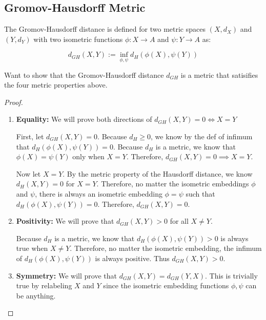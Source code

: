 \documentclass{article}
\begin{document}
    \subsection{Gromov-Hausdorff Metric}

    The Gromov-Hausdorff distance is defined for two metric spaces $(X, d_X)$ and $(Y, d_Y)$ with two isometric functions $\phi: X \rightarrow A$ and $\psi: Y \rightarrow A$ as: 

    \begin{equation*}
        d_{GH}(X,Y) := \inf_{\phi, \psi} d_H(\phi(X), \psi(Y))
    \end{equation*}

    Want to show that the Gromov-Hausdorff distance $d_{GH}$ is a metric that satisifies the four metric properties above.

    \begin{proof}
    \begin{enumerate}
    We will prove all four proerties of a metric in a metric space for the Gromov-Hausdorff distance.

        \item \textbf{Equality:} We will prove both directions of $d_{GH}(X,Y) = 0 \iff X = Y $
        
        First, let $d_{GH}(X,Y) = 0$. Because $d_H \geq 0$, we know by the def of infimum that $d_H(\phi(X), \psi(Y)) = 0$. Because $d_H$ is a metric, we know that $\phi(X) = \psi(Y)$ only when $X=Y$. Therefore, $d_{GH}(X,Y) = 0 \implies X = Y$.

        Now let $X=Y$. By the metric property of the Hausdorff distance, we know $d_H(X,Y) = 0$ for $X=Y$. Therefore, no matter the isometric embeddings $\phi$ and $\psi$, there is always an isometric embedding $\phi = \psi$ such that $d_H(\phi(X), \psi(Y)) = 0$. Therefore, $d_{GH}(X,Y) = 0$.

        \item \textbf{Positivity:} We will prove that $d_{GH}(X,Y) > 0$ for all $X \neq Y $.
        
        Because $d_H$ is a metric, we know that $d_H(\phi(X), \psi(Y)) > 0$ is always true when $X \neq Y$. Therefore, no matter the isometric embedding, the infimum of $d_H(\phi(X), \psi(Y))$ is always positive. Thus $d_{GH}(X,Y) > 0$.

        \item \textbf{Symmetry:} We will prove that $d_{GH}(X,Y) = d_{GH}(Y,X)$. This is trivially true by relabeling $X$ and $Y$ since the isometric embedding functions $\phi, \psi$ can be anything.
        

\end{enumerate}
\end{proof}
\end{document}
